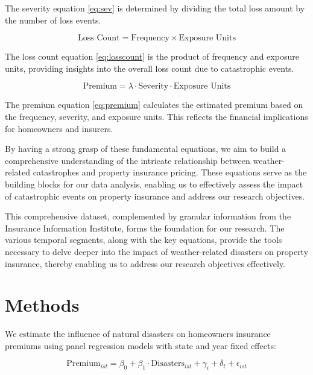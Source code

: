 \documentclass[12pt]{article}
\begin{document}
The severity equation \ref{eq:sev} is determined by dividing the total loss amount by the number of loss events.

\begin{equation}
    \label{eq:losscount}
    \text{Loss Count} = \text{Frequency} \times \text{Exposure Units}
\end{equation}

The loss count equation \ref{eq:losscount} is the product of frequency and exposure units, providing insights into the overall loss count due to catastrophic events.

\begin{equation}
    \label{eq:premium}
    \text{Premium} = \lambda \cdot \text{Severity} \cdot \text{Exposure Units}
\end{equation}

The premium equation \ref{eq:premium} calculates the estimated premium based on the frequency, severity, and exposure units. This 
reflects the financial implications for homeowners and insurers.

By having a strong grasp of these fundamental equations, we aim to build a comprehensive understanding of the intricate relationship 
between weather-related catastrophes and property insurance pricing. These equations serve as the building blocks for our data 
analysis, enabling us to effectively assess the impact of catastrophic events on property insurance and address our research 
objectives.

This comprehensive dataset, complemented by granular information from the Insurance Information Institute, forms the foundation for 
our research. The various temporal segments, along with the key equations, provide the tools necessary to delve deeper into the 
impact of weather-related disasters on property insurance, thereby enabling us to address our research objectives effectively. 



\section{Methods}
\label{sec:meth}
We estimate the influence of natural disasters on homeowners insurance premiums using panel regression models with state and year 
fixed effects:

\begin{equation} 
    \mathrm{Premium}_{ist} = \beta_0 + \beta_1 \cdot \mathrm{Disasters}_{ist} + \gamma_i + \delta_t + \epsilon_{ist}
\end{equation}
\end{document}
